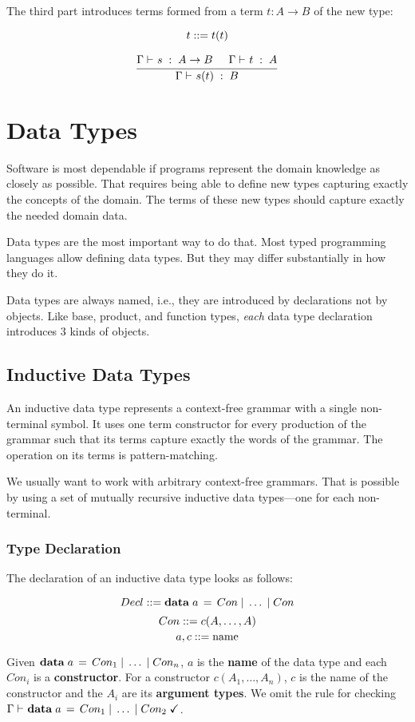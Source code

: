 The third part introduces terms formed from a term $t:A\to B$ of the new type:

\[t ::= t(t)\]

\[\cfrac{\Gamma\vdash^{}_{}s\;:\;A\to B\hspace*{.5cm} \Gamma\vdash^{}_{}t\;:\;A}{\Gamma\vdash^{}_{}s(t)\;:\;B}\,\]


  
\section{Data Types}

Software is most dependable if programs represent the domain knowledge as closely as possible.
That requires being able to define new types capturing exactly the concepts of the domain.
The terms of these new types should capture exactly the needed domain data.

Data types are the most important way to do that.
Most typed programming languages allow defining data types.
But they may differ substantially in how they do it.

Data types are always named, i.e., they are introduced by declarations not by objects.
Like base, product, and function types, \emph{each} data type declaration introduces $3$ kinds of objects.

\subsection{Inductive Data Types}

An inductive data type represents a context-free grammar with a single non-terminal symbol.
It uses one term constructor for every production of the grammar such that its terms capture exactly the words of the grammar.
The operation on its terms is pattern-matching.

We usually want to work with arbitrary context-free grammars.
That is possible by using a set of mutually recursive inductive data types---one for each non-terminal.

\subsubsection{Type Declaration}

The declaration of an inductive data type looks as follows:

\[Decl \bbc \adata{a}{Con,\ldots,Con}\]
\[Con ::= c(A,\ldots,A)\]
\[a,c ::= \text{name} \]

Given $\adata{a}{Con_1,\ldots,Con_n}$, $a$ is the \textbf{name} of the data type and each $Con_i$ is a \textbf{constructor}.
For a constructor $c(A_1,\ldots,A_n)$, $c$ is the name of the constructor and the $A_i$ are its \textbf{argument types}.
We omit the rule for checking $\isdecl{}{\Gamma}{\adata{a}{Con_1,\ldots,Con_2}}$.

